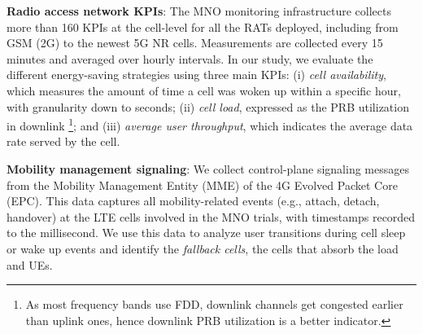 \textbf{Radio access network KPIs}:
The MNO monitoring infrastructure collects more than 160 KPIs at the cell-level for all the RATs deployed, including from GSM (2G) to the newest 5G NR cells. Measurements are collected every 15 minutes and averaged over hourly intervals. %
In our study, we evaluate the different energy-saving strategies using three main KPIs: (i) \textit{cell availability}, which measures the amount of time a cell was woken up within a specific hour, with granularity down to seconds; (ii) \textit{cell load}, expressed as the PRB utilization in downlink%
\footnote{As most frequency bands use FDD, downlink channels get congested earlier than uplink ones, hence downlink PRB utilization is a better indicator.};
and (iii) \textit{average user throughput}, which indicates the average data rate served by the cell.

\textbf{Mobility management signaling}:
We collect control-plane signaling messages from the Mobility Management Entity (MME) of the 4G Evolved Packet Core (EPC). This data captures all mobility-related events (e.g., attach, detach, handover) at the LTE cells involved in the MNO trials, with timestamps recorded to the millisecond. We use this data %
to analyze user transitions during cell sleep or wake up events and identify the \textit{fallback cells}, \ie the cells that absorb the load and UEs.

